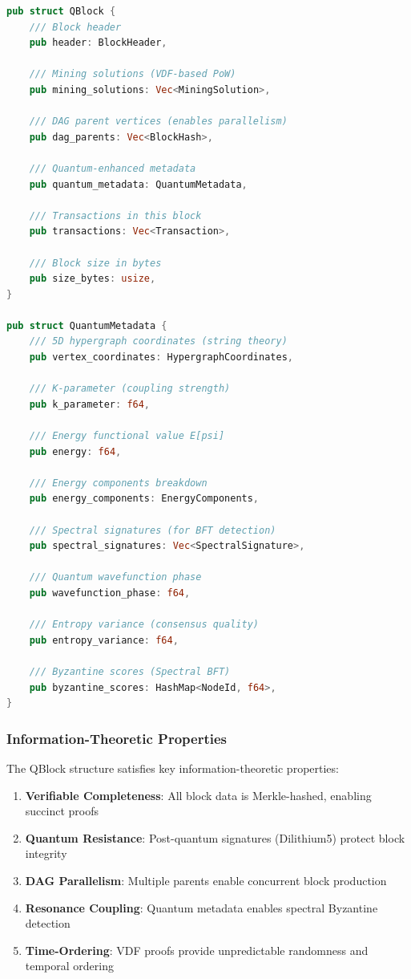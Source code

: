 \documentclass[11pt,a4paper]{article}
\begin{document}
\begin{lstlisting}[language=Rust, caption=Quantum Metadata in QBlock]
pub struct QBlock {
    /// Block header
    pub header: BlockHeader,

    /// Mining solutions (VDF-based PoW)
    pub mining_solutions: Vec<MiningSolution>,

    /// DAG parent vertices (enables parallelism)
    pub dag_parents: Vec<BlockHash>,

    /// Quantum-enhanced metadata
    pub quantum_metadata: QuantumMetadata,

    /// Transactions in this block
    pub transactions: Vec<Transaction>,

    /// Block size in bytes
    pub size_bytes: usize,
}

pub struct QuantumMetadata {
    /// 5D hypergraph coordinates (string theory)
    pub vertex_coordinates: HypergraphCoordinates,

    /// K-parameter (coupling strength)
    pub k_parameter: f64,

    /// Energy functional value E[psi]
    pub energy: f64,

    /// Energy components breakdown
    pub energy_components: EnergyComponents,

    /// Spectral signatures (for BFT detection)
    pub spectral_signatures: Vec<SpectralSignature>,

    /// Quantum wavefunction phase
    pub wavefunction_phase: f64,

    /// Entropy variance (consensus quality)
    pub entropy_variance: f64,

    /// Byzantine scores (Spectral BFT)
    pub byzantine_scores: HashMap<NodeId, f64>,
}
\end{lstlisting}

\subsubsection{Information-Theoretic Properties}

The QBlock structure satisfies key information-theoretic properties:

\begin{enumerate}
    \item \textbf{Verifiable Completeness}: All block data is Merkle-hashed, enabling succinct proofs
    \item \textbf{Quantum Resistance}: Post-quantum signatures (Dilithium5) protect block integrity
    \item \textbf{DAG Parallelism}: Multiple parents enable concurrent block production
    \item \textbf{Resonance Coupling}: Quantum metadata enables spectral Byzantine detection
    \item \textbf{Time-Ordering}: VDF proofs provide unpredictable randomness and temporal ordering
\end{enumerate}
\end{document}
